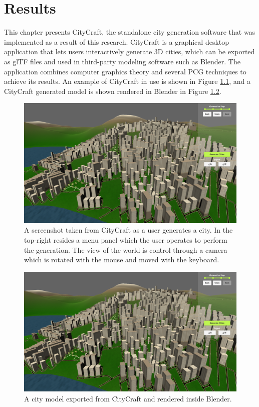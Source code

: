 \chapter{Results}

This chapter presents CityCraft, the standalone city generation software that was implemented as a result of this research.
CityCraft is a graphical desktop application that lets users interactively generate 3D cities, which can be exported as glTF files and used in third-party modeling software such as Blender.
The application combines computer graphics theory and several PCG techniques to achieve its results.
An example of CityCraft in use is shown in Figure \ref{fig:screenshot}, and a CityCraft generated model is shown rendered in Blender in Figure \ref{fig:blender}.

\begin{figure}[H]
  \centering
  \includegraphics[width=\textwidth]{figure/results/screenshot.png}

  \caption{A screenshot taken from CityCraft as a user generates a city. In the top-right resides a menu panel which the user operates to perform the generation. The view of the world is control through a camera which is rotated with the mouse and moved with the keyboard.}
  \label{fig:screenshot}
\end{figure}

\begin{figure}[H]
  \centering
  \includegraphics[width=\textwidth]{figure/results/screenshot.png}

  \caption{A city model exported from CityCraft and rendered inside Blender.}
  \label{fig:blender}
\end{figure}

